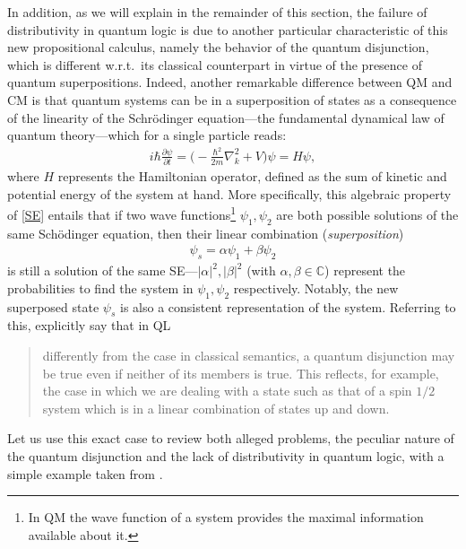 \documentclass[11pt, executivepaper]{article}
\begin{document}
In addition, as we will explain in the remainder of this section, the failure of distributivity in quantum logic is due to another particular characteristic of this new propositional calculus, namely the behavior of the quantum disjunction, which is different w.r.t.\ its classical counterpart in virtue of the presence of quantum superpositions. Indeed, another remarkable difference between QM  and CM is that quantum systems can be in a superposition of states as a consequence of the linearity of the Schr\"odinger equation---the fundamental dynamical law of quantum theory---which for a single particle reads: 
\begin{align}
	\label{SE}
	i\hbar\frac{\partial\psi}{\partial t}=\Big(-\frac{\hbar^2}{2m}\nabla_k^2+V\Big)\psi=H\psi,
\end{align}
\noindent where $H$ represents the Hamiltonian operator, defined as the sum of kinetic and potential energy of the system at hand. More specifically, this algebraic property of \eqref{SE} entails that if two wave functions\footnote{In QM the wave function of a system provides the maximal information available about it.} $\psi_1, \psi_2$ are both possible solutions of the same Sch\"odinger equation, then their linear combination (\emph{superposition}) 
\begin{align}
	\psi_s=\alpha\psi_{1}+\beta\psi_{2} \nonumber
\end{align} 
is still a solution of the same SE---$|\alpha|^2,|\beta|^2$ (with $\alpha,\beta\in\mathbb{C}$) represent the probabilities to find the system in $\psi_1, \psi_2$ respectively. Notably, the new superposed state $\psi_s$ is also a consistent representation of the system. Referring to this, \cite{deRonde:2016} explicitly say that in QL 
\begin{quote}
	differently from the case in classical semantics, a quantum disjunction may be true even if neither of its members is true. This reflects, for example, the case in which we are dealing with a state such as that of a spin $1/2$ system which is in a linear combination of states up and down.
\end{quote}
\noindent Let us use this exact case to review both alleged problems, the peculiar nature of the quantum disjunction and the lack of distributivity in quantum logic, with a simple example taken from \cite{Giuntini:2002}.
\end{document}
